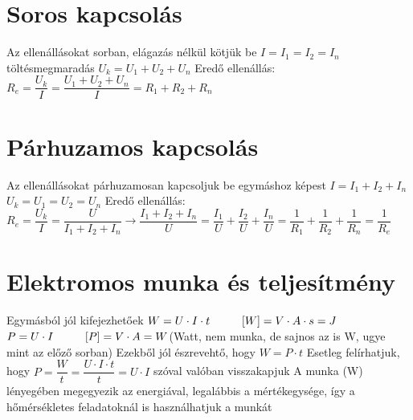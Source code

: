 \documentclass [12pt,a4paper] {article}
\begin{document}
\section{Soros kapcsolás}
Az ellenállásokat sorban, elágazás nélkül kötjük be \newline
$I = I_1 = I_2 = I_n$ töltésmegmaradás \newline
$U_k = U_1 + U_2 + U_n$ \newline
Eredő ellenállás: $R_e = \dfrac{U_k}{I} = \dfrac{U_1 + U_2 + U_n}{I} = R_1 + R_2 + R_n$

\section{Párhuzamos kapcsolás}
Az ellenállásokat párhuzamosan kapcsoljuk be egymáshoz képest \newline
$I = I_1 + I_2 + I_n$ \newline
$U_k = U_1 = U_2 = U_n$ \newline
Eredő ellenállás: $R_e = \dfrac{U_k}{I} = \dfrac{U}{I_1 + I_2 + I_n} \rightarrow \dfrac{I_1 + I_2 + I_n}{U} = \dfrac{I_1}{U} + \dfrac{I_2}{U} + \dfrac{I_n}{U} = \dfrac{1}{R_1} + \dfrac{1}{R_2} + \dfrac{1}{R_n} = \dfrac{1}{R_e}$

\section{Elektromos munka és teljesítmény}
Egymásból jól kifejezhetőek \newline
$W = U\cdot I\cdot t \hspace{10mm} [W] = V\cdot A\cdot s = J$ \newline
$P = U\cdot I \hspace{10mm} [P] = V\cdot A = W$(Watt, nem munka, de sajnos az is W, ugye mint az előző sorban) \newline
Ezekből jól észrevehtő, hogy $W = P\cdot t$ \newline
Esetleg felírhatjuk, hogy $P = \dfrac{W}{t} = \dfrac{U\cdot I\cdot t}{t} = U\cdot I$ szóval valóban visszakapjuk \newline
A munka (W) lényegében megegyezik az energiával, legalábbis a mértékegysége, így a hőmérsékletes feladatoknál is használhatjuk a munkát
\end{document}
